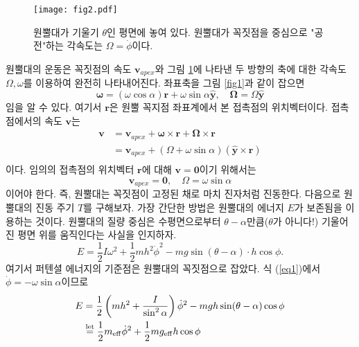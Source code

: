 \documentclass[11pt]{article}
\begin{document}
\begin{figure}[h]
\centering
\texttt{[image: fig2.pdf]}
\caption{원뿔대가 기울기 $\theta$인 평면에 놓여 있다. 원뿔대가 꼭짓점을 중심으로 "공전"하는 각속도는 $\Omega=\dot{\phi}$이다.}
\label{fig2}
\end{figure}
 
  원뿔대의 운동은 꼭짓점의 속도 $\mathbf{v}_{apex}$와 그림 \ref{fig2}에 나타낸 두 방향의 축에 대한 각속도 $\Omega, \omega$를 이용하여 완전히 나타내어진다. 좌표축을 그림 \ref{fig1}과 같이 잡으면
  \begin{equation}
  \mathbf{\omega} =(\omega \cos{\alpha})\mathbf{r}+\omega \sin{\alpha} \hat{\mathbf{y}}, \quad \mathbf{\Omega}=\Omega \hat{\mathbf{y}} 
  \end{equation}
임을 알 수 있다. 여기서 $\mathbf{r}$은 원뿔 꼭지점 좌표계에서 본 접촉점의 위치벡터이다. 접촉점에서의 속도 $\mathbf{v}$는
\begin{equation}
\begin{aligned}
\mathbf{v} &=\mathbf{v}_{apex}+\mathbf{\omega}\times \mathbf{r}+\mathbf{\Omega}\times \mathbf{r} \\
&=\mathbf{v}_{apex} + (\Omega+\omega \sin\alpha)(\hat{\mathbf{y}} \times \mathbf{r}) \\
\end{aligned}
\end{equation}
이다. 임의의 접촉점의 위치벡터 $\mathbf{r}$에 대해 $\mathbf{v}=\mathbf{0}$이기 위해서는
\begin{equation} \label{eq1}
\mathbf{v}_{apex}=\mathbf{0}, \quad \Omega = \omega \sin\alpha
\end{equation}
이어야 한다. 즉, 원뿔대는 꼭짓점이 고정된 채로 마치 진자처럼 진동한다. 다음으로 원뿔대의 진동 주기 $T$를 구해보자. 가장 간단한 방법은 원뿔대의 에너지 $E$가 보존됨을 이용하는 것이다. 원뿔대의 질량 중심은 수평면으로부터 $\theta-\alpha$만큼($\theta$가 아니다!) 기울어진 평면 위를 움직인다는 사실을 인지하자. 
\begin{equation} \label{eq2}
E=\frac12 I \omega^2 + \frac12 mh^2\dot{\phi}^2-mg\sin(\theta-\alpha) \cdot h\cos\phi.
\end{equation}  
 여기서 퍼텐셜 에너지의 기준점은 원뿔대의 꼭짓점으로 잡았다. 식 (\ref{eq1})에서 $\dot{\phi}=-\omega \sin\alpha$이므로
 \begin{equation}
 \begin{aligned}
 E &=\frac12 \left( mh^2+\frac{I}{\sin^2\alpha}\right) \dot{\phi}^2 - mgh\sin(\theta-\alpha)\cos\phi \\
 &\stackrel{\rm let}{=} \frac12 m_{\rm eff} \dot{\phi}^2 + \frac12 mg_{\rm eff}h\cos\phi \\
\end{aligned}
 \end{equation} 
\end{document}
